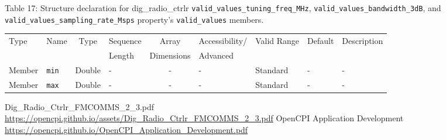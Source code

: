 \documentclass{article}
\def\comp{dig\_radio\_ctrlr}
\begin{document}
\begin{landscape}
	\noindent Table \hypertarget{tab17}{17}: Structure declaration for \comp{} \verb+valid_values_tuning_freq_MHz+, \verb+valid_values_bandwidth_3dB+, and \\ \verb+valid_values_sampling_rate_Msps+ property's \verb+valid_values+ members.
	\begin{scriptsize}
		\noindent\begin{longtable}{|p{1.8cm}|p{3.6cm}|c|p{4cm}|c|p{2cm}|p{1.7cm}|p{0.8cm}|p{4.69cm}|}
			\hline
			\rowcolor{blue}
			Type         & Name                                & Type & Sequence & Array      & Accessibility/ & Valid Range  & Default & Description                                                                                                                                                                                                                       \\
			\rowcolor{blue}
			             &                                     &      & Length   & Dimensions & Advanced       &              &         &                                                                                                                                                                                                                             \\
			\hline
			Member       & \verb+min+                          & Double & -       & -          & -              & Standard     & -       & - \\
			\hline
			Member       & \verb+max+                          & Double & -       & -          & -              & Standard     & -       & - \\
			\hline
		\end{longtable}
	\end{scriptsize}

\end{landscape}


 


\begin{thebibliography}{1}

   Dig\_Radio\_Ctrlr\_FMCOMMS\_2\_3.pdf \\
  \url{https://opencpi.github.io/assets/Dig_Radio_Ctrlr_FMCOMMS_2_3.pdf}
   OpenCPI Application Development \\
  \url{https://opencpi.github.io/OpenCPI_Application_Development.pdf}

\end{thebibliography}
\end{document}
